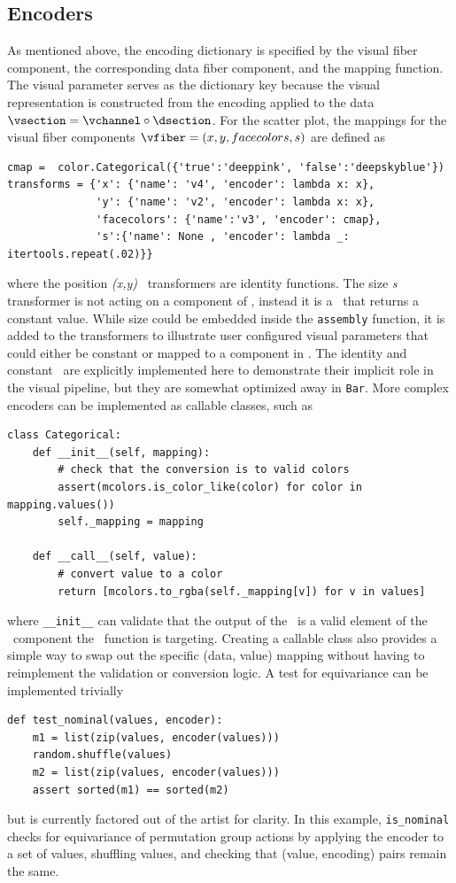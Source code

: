 \documentclass[../main.tex]{subfiles}
\begin{document}
\subsection{Encoders \vchannel}
\label{sec:code_channels}
As mentioned above, the encoding dictionary is specified by the visual fiber component, the corresponding data fiber component, and the mapping function. The visual parameter serves as the dictionary key because the visual representation is constructed from the encoding applied to the data  $\vsection = \vchannel \circ \dsection$. For the scatter plot, the mappings for the visual fiber components $\vfiber=(x,y, facecolors, s)$ are defined as
\begin{verbatim}
cmap =  color.Categorical({'true':'deeppink', 'false':'deepskyblue'})
transforms = {'x': {'name': 'v4', 'encoder': lambda x: x},
              'y': {'name': 'v2', 'encoder': lambda x: x},
              'facecolors': {'name':'v3', 'encoder': cmap}, 
              's':{'name': None , 'encoder': lambda _: itertools.repeat(.02)}}
\end{verbatim}
where the position \textit{(x,y)} \vchannel\ transformers are identity functions. The size \textit{s} transformer is not acting on a component of \dfiber, instead it is a \vchannel\ that returns a constant value. While size could be embedded inside the \texttt{assembly} function, it is added to the transformers to illustrate user configured visual parameters that could either be constant or mapped to a component in \dfiber. The identity and constant \vchannel\ are explicitly implemented here to demonstrate their implicit role in the visual pipeline, but they are somewhat optimized away in \texttt{Bar}. More complex encoders can be implemented as callable classes, such as 
\begin{verbatim}
class Categorical:
    def __init__(self, mapping):
        # check that the conversion is to valid colors
        assert(mcolors.is_color_like(color) for color in mapping.values())
        self._mapping = mapping

    def __call__(self, value):
        # convert value to a color
        return [mcolors.to_rgba(self._mapping[v]) for v in values]
\end{verbatim}

where \texttt{__init__} can validate that the output of the \vchannel\ is a valid element of the \vfiber\ component the \vchannel\ function is targeting. Creating a callable class also provides a simple way to swap out the specific (data, value) mapping without having to reimplement the validation or conversion logic. A test for equivariance can be implemented trivially
\begin{verbatim}
def test_nominal(values, encoder):
    m1 = list(zip(values, encoder(values)))
    random.shuffle(values)
    m2 = list(zip(values, encoder(values)))
    assert sorted(m1) == sorted(m2)
\end{verbatim}
but is currently factored out of the artist for clarity. In this example, \texttt{is_nominal} checks for equivariance of permutation group actions by applying the encoder to a set of values, shuffling values, and checking that (value, encoding) pairs remain the same.
\end{document}
